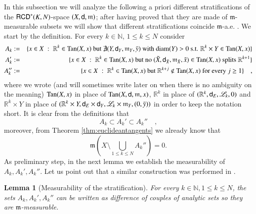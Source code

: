 \documentclass[11pt,reqno]{amsart}
\newcommand{\diam}{\text{diam}}
\newcommand{\mm}{\mathfrak m}
\newcommand{\sfd}{{\sf d}}
\newcommand{\LL}{\mathscr{L}}
\newcommand{\R}{\mathbb{R}}
\newcommand{\N}{\mathbb{N}}
\newcommand{\Tan}{{\rm Tan}}
\newcommand{\RCD}{{\sf RCD}}
\newtheorem{lemma}[theorem]{Lemma}
\theoremstyle{definition}
\theoremstyle{remark}
\theoremstyle{remark}
\theoremstyle{remark}
\theoremstyle{remark}
\theoremstyle{remark}
\theoremstyle{remark}
\theoremstyle{remark}
\begin{document}
In this subsection we will analyze the following a priori different stratifications of the $\RCD^*(K,N)$-space $(X,\sfd,\mm)$; after having proved that they are made of $\mm$-measurable subsets we will show that different stratifications coincide $\mm$-a.e. .  We start by the definition. For every $k \in \N$, $1\leq k\leq N$ consider
\begin{eqnarray}
A_k&:=&\{x \in X\; : \; \R^k \in \Tan(X,x) \text{ but } \nexists  (Y,\sfd_Y,\mm_Y, \bar{y}) \text{ with } \diam(Y)>0 \text{ s.t. }  \R^k \times Y  \in \Tan(X,x) \}   \label{eq:defAk} \\
A_k'&:=&\{x \in X\; : \; \R^k \in \Tan(X,x) \text{ but  no } (\tilde{X}, \sfd_{\tilde{X}}, \mm_{\tilde{X}}, \tilde{x}) \in  \Tan(X,x) \text{ splits  } \R^{k+1}     \}   \label{eq:defAk'} \\
A_k''&:=&\{x \in X\; : \; \R^k \in \Tan(X,x) \text{ but   } \R^{k+j} \notin  \Tan(X,x) \text{ for every } j\geq 1     \}  \quad ,  \label{eq:defAk''} 
\end{eqnarray} 
where we wrote (and will sometimes write later on when there is no ambiguity on the meaning) $\Tan(X,x)$ in place of $\Tan(X,\sfd,\mm,x)$,   $\R^k$ in place of $(\R^k, \sfd_E, \LL_k,0 )$ and $\R^k \times Y$ in place of $(\R^k\times Y,\sfd_E\times \sfd_Y,\LL_k \times \mm_Y, (0,\bar{y}))$ in order to keep the notation short. It is clear from the definitions that 
\begin{equation}\label{eq:AkIncl}
A_k\subset A_k'\subset A_k''\quad,
\end{equation}
moreover, from Theorem \ref{thm:euclideantangents} we already know that 
\begin{equation}\label{eq:Ak''All}
\mm\left(X\setminus \bigcup_{1\leq k \leq N } A_k''\right)=0.
\end{equation}  
As preliminary step, in the next lemma we establish the measurability of $A_k, A_k', A_k''$. Let us point out that a similar construction was performed in \cite{GMR2013}.

\begin{lemma}[Measurability of the stratification]\label{lem:AkMeas}
For every $k\in \N, 1\leq k\leq N$, the sets $A_k, A_k', A_k''$ can be written as difference of couples of analytic sets so they are $\mm$-measurable.
\end{lemma}
\end{document}
